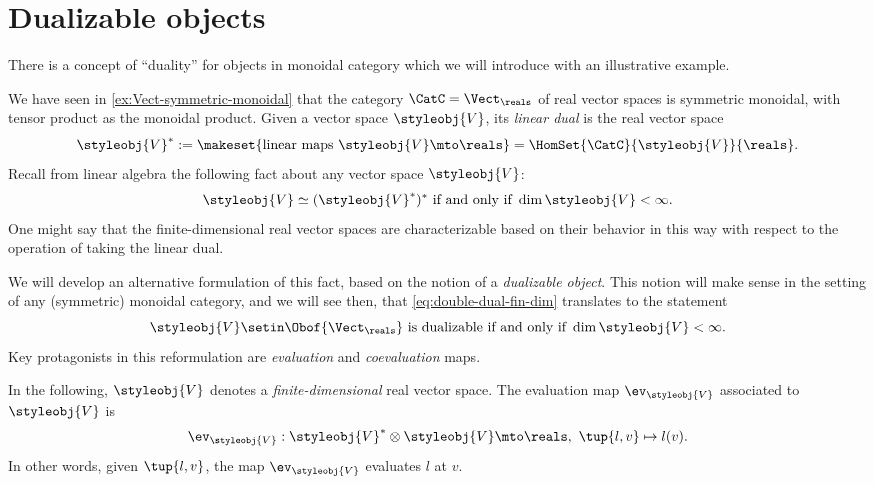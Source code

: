 
\section{Dualizable objects}
\label{sec:dual-objects}
There is a concept of ``duality'' for objects in monoidal category which we will introduce with an illustrative example.

We have seen in \cref{ex:Vect-symmetric-monoidal} that the category $\CatC = \Vect_{\reals}$ of real vector spaces is symmetric monoidal, with tensor product as the monoidal product.
Given a vector space $\styleobj{V} $, its \emph{linear dual} is the real vector space
\begin{equation}
    \label{eq:lin-dual-vecsp}
    \styleobj{V} ^{*} := \makeset{ \text{linear maps } \styleobj{V} \mto \reals } = \HomSet{\CatC}{\styleobj{V}}{ \reals}.
\end{equation}
%
Recall from linear algebra the following fact about any vector space $\styleobj{V} $:
%
\begin{equation}
    \label{eq:double-dual-fin-dim}
    \styleobj{V}  \simeq (\styleobj{V} ^{*})^* \text{ if and only if } \dim \styleobj{V}  < \infty.
\end{equation}
%
One might say that the finite-dimensional real vector spaces are characterizable based on their behavior in this way with respect to the operation of taking the linear dual.

We will develop an alternative formulation of this fact, based on the notion of a \emph{dualizable object}.
This notion will make sense in the setting of any (symmetric) monoidal category, and we will see then, that \cref{eq:double-dual-fin-dim} translates to the statement
\begin{equation}
    \label{eq:dualizable-fin-dim}
    \styleobj{V}  \setin \Obof{\Vect_\reals} \text{ is dualizable if and only if } \dim \styleobj{V}  < \infty.
\end{equation}
%
Key protagonists in this reformulation are \emph{evaluation} and \emph{coevaluation} maps.

In the following,  $\styleobj{V} $ denotes a \emph{finite-dimensional} real vector space.
The evaluation map $\ev_\styleobj{V} $ associated to $\styleobj{V} $ is
\begin{equation}
    \label{eq:evaluation-vecsp}
    \ev_\styleobj{V}  : \styleobj{V}^* \otimes \styleobj{V}  \mto \reals, \ \tup{l, v} \mapsto l(v).
\end{equation}
In other words, given $\tup{l, v}$, the map $\ev_\styleobj{V} $ evaluates $l$ at $v$.


